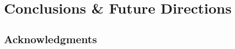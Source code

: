 \documentclass[\docopts]{\docclass}
\begin{document}

\section{Conclusions \& Future Directions}
\label{sec:conclusions}

%
%



\subsection*{Acknowledgments}








\end{document}
